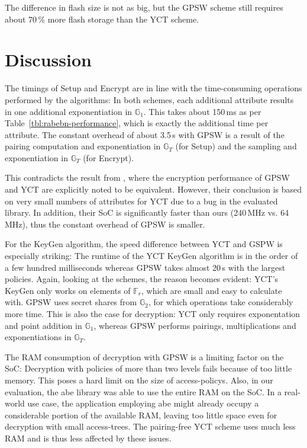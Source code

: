 The difference in flash size is not as big, but the GPSW scheme still requires about 70\,\% more flash storage than the YCT scheme.


\section{Discussion}
The timings of Setup and Encrypt are in line with the time-consuming operations performed by the algorithms: 
In both schemes, each additional attribute results in one additional exponentiation in $\mathbb{G}_1$.
This takes about 150\,ms as per Table~\ref{tbl:rabebn-performance}, which is exactly the additional time per attribute.
The constant overhead of about 3.5\,s with GPSW is a result of the pairing computation and exponentiation in $\mathbb{G}_T$ (for Setup) and the sampling and exponentiation in $\mathbb{G}_T$ (for Encrypt).

This contradicts the result from \cite{girgenti_feasibility_2019}, where the encryption performance of GPSW and YCT are explicitly noted to be equivalent.
However, their conclusion is based on very small numbers of attributes for YCT due to a bug in the evaluated library.
In addition, their SoC is significantly faster than ours (240\,MHz vs. 64\,MHz), thus the constant overhead of GPSW is smaller.

For the KeyGen algorithm, the speed difference between YCT and GSPW is especially striking: 
The runtime of the YCT KeyGen algorithm is in the order of a few hundred milliseconds whereas GPSW takes almost 20\,s with the largest policies.
Again, looking at the schemes, the reason becomes evident: YCT's KeyGen only works on elements of $\mathbb{F}_r$, which are small and easy to calculate with.
GPSW uses secret shares from $\mathbb{G}_2$, for which operations take considerably more time.
This is also the case for decryption: YCT only requires exponentation and point addition in $\mathbb{G}_1$, whereas GPSW performs pairings, multiplications and exponentiations in $\mathbb{G}_T$.

The RAM consumption of decryption with GPSW is a limiting factor on the SoC:
Decryption with policies of more than two levels fails because of too little memory.
This poses a hard limit on the size of \glspl{access-policy}.
Also, in our evaluation, the \acrshort{abe} library was able to use  the entire RAM on the SoC.
In a real-world use case, the application employing \acrshort{abe} might already occupy a considerable portion of the available RAM, leaving too little space even for decryption with small \glspl{access-tree}.
The pairing-free YCT scheme uses much less RAM and is thus less affected by these issues.\\

